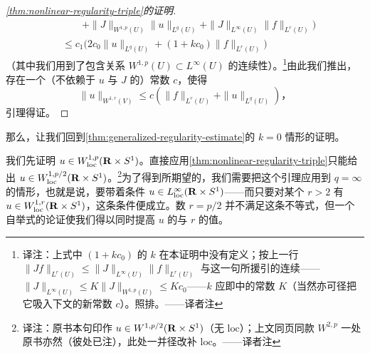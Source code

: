 \begin{proof}[\cref{thm:nonlinear-regularity-triple}的证明]
\[\begin{aligned}
&\qquad+\|J\|_{W^{1,p}(U)}\|u\|_{L^{q}(U)}+\|J\|_{L^{\infty}(U)}\|f\|_{L^{r}(U)}\Bigr)\\
&\le c_{1}\bigl(2c_{0}\|u\|_{L^{q}(U)}+(1+kc_{0})\|f\|_{L^{r}(U)}\bigr)
\end{aligned}
\]
（其中我们用到了包含关系 $W^{1,p}(U)\subset L^{\infty}(U)$ 的连续性）。\footnote{译注：上式中 $(1+kc_{0})$ 的 $k$ 在本证明中没有定义；按上一行 $\|Jf\|_{L^{r}(U)}\le\|J\|_{L^{\infty}(U)}\|f\|_{L^{r}(U)}$ 与这一句所援引的连续\trEmbedding——$\|J\|_{L^{\infty}(U)}\le K\|J\|_{W^{1,p}(U)}\le Kc_{0}$——$k$ 应即\trSobolev\trEmbedding{}中的常数 $K$（当然亦可径把它吸入下文的新常数 $c$）。照排。——译者注}由此我们推出，存在一个（不依赖于 $u$ 与 $J$ 的）常数 $c$，使得
\[
\|u\|_{W^{1,r}(V)}\le c\left(\|f\|_{L^{r}(U)}+\|u\|_{L^{q}(U)}\right)\text{，}
\]
引理得证。
\end{proof}

那么，让我们回到\cref{thm:generalized-regularity-estimate}的 $k=0$ 情形的证明。

我们先证明 $u\in W^{1,p}_{\mathrm{loc}}(\mathbf{R}\times S^{1})$。直接应用\cref{thm:nonlinear-regularity-triple}只能给出 $u\in W^{1,p/2}_{\mathrm{loc}}(\mathbf{R}\times S^{1})$。\footnote{译注：原书本句印作 $u\in W^{1,p/2}(\mathbf{R}\times S^{1})$（无 $\mathrm{loc}$）；上文同页同款 $W^{2,p}$ 一处原书亦然（彼处已注），此处一并径改补 $\mathrm{loc}$。——译者注}为了得到所期望的\trRegularity，我们需要把这个引理应用到 $q=\infty$ 的情形，也就是说，要带着条件 $u\in L^{\infty}_{\mathrm{loc}}(\mathbf{R}\times S^{1})$——而只要对某个 $r>2$ 有 $u\in W^{1,r}_{\mathrm{loc}}(\mathbf{R}\times S^{1})$，这条条件便成立。数 $r=p/2$ 并不满足这条不等式，但一个自举式的论证使我们得以同时提高 $u$ 的\trRegularity{}与 $r$ 的值。

